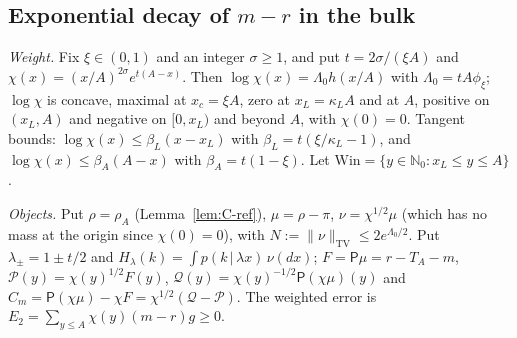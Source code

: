 \subsection{Exponential decay of $m-r$ in the bulk}

\emph{Weight.} Fix $\xi\in(0,1)$ and an integer $\sigma\ge1$, and put $t=2\sigma/(\xi A)$ and $\chi(x)=(x/A)^{2\sigma}e^{t(A-x)}$. Then
$\log\chi(x)=\Lambda_0h(x/A)$ with $\Lambda_0=tA\phi_\xi$; $\log\chi$ is concave, maximal at $x_c=\xi A$, zero at $x_L=\kappa_LA$ and at
$A$, positive on $(x_L,A)$ and negative on $[0,x_L)$ and beyond $A$, with $\chi(0)=0$. Tangent bounds:
$\log\chi(x)\le\beta_L(x-x_L)$ with $\beta_L=t(\xi/\kappa_L-1)$, and $\log\chi(x)\le\beta_A(A-x)$ with $\beta_A=t(1-\xi)$.
Let $\mathrm{Win}=\{y\in\mathbb N_0:x_L\le y\le A\}$.

\emph{Objects.} Put $\rho=\rho_A$ (Lemma~\ref{lem:C-ref}), $\mu=\rho-\pi$, $\nu=\chi^{1/2}\mu$ (which has no mass at the origin since $\chi(0)=0$),
with $N:=\|\nu\|_{\mathrm{TV}}\le2e^{\Lambda_0/2}$. Put $\lambda_\pm=1\pm t/2$ and $H_\lambda(k)=\int p(k\,|\,\lambda x)\,\nu(dx)$;
$F=\mathsf P\mu=r-T_A-m$, $\mathcal P(y)=\chi(y)^{1/2}F(y)$, $\mathcal Q(y)=\chi(y)^{-1/2}\mathsf P(\chi\mu)(y)$ and
$C_m=\mathsf P(\chi\mu)-\chi F=\chi^{1/2}(\mathcal Q-\mathcal P)$. The weighted error is
$E_2=\sum_{y\le A}\chi(y)(m-r)g\ge0$.

